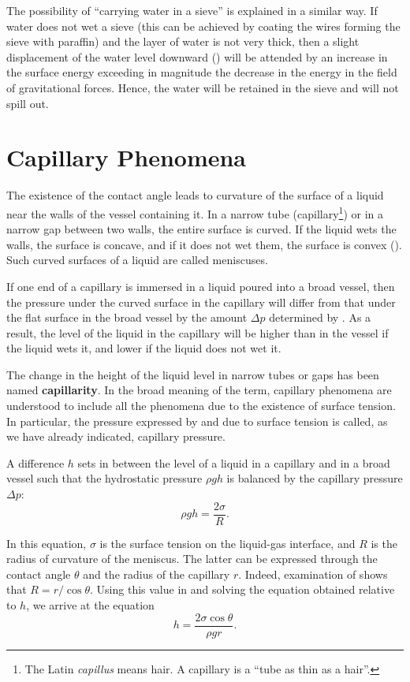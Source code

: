 The possibility of ``carrying water in a sieve'' is explained in a similar way. If water does not wet a sieve (this can be achieved by coating the wires forming the sieve with paraffin) and the layer of water is not very thick, then a slight displacement of the water level downward () will be attended by an increase in the surface energy exceeding in magnitude the decrease in the energy in the field of gravitational forces. Hence, the water will be retained in the sieve and will not spill out.

\section{Capillary Phenomena}\label{sec:14_5}

The existence of the contact angle leads to curvature of the surface of a liquid near the walls of the vessel containing it. In a narrow tube (capillary\footnote{The Latin \textit{capillus} means hair. A capillary is a ``tube as thin as a hair''.}) or in a narrow gap between two walls, the entire surface is curved. If the liquid wets the walls, the surface is concave, and if it does not wet them, the surface is convex (). Such curved surfaces of a liquid are called meniscuses.

If one end of a capillary is immersed in a liquid poured into a broad vessel, then the pressure under the curved surface in the capillary will differ from that under the flat surface in the broad vessel by the amount $\Delta p$ determined by . As a result, the level of the liquid in the capillary will be higher than in the vessel if the liquid wets it, and lower if the liquid does not wet it.

The change in the height of the liquid level in narrow tubes or gaps has been named \textbf{capillarity}. In the broad meaning of the term, capillary phenomena are understood to include all the phenomena due to the existence of surface tension. In particular, the pressure expressed by  and due to surface tension is called, as we have already indicated, capillary pressure. 

A difference $h$ sets in between the level of a liquid in a capillary and in a broad vessel such that the hydrostatic pressure $\rho gh$ is balanced by the capillary pressure $\Delta p$:
\begin{equation}\label{eq:14_8}
	\rho gh = \frac{2\sigma}{R}.
\end{equation}

\noindent
In this equation, $\sigma$ is the surface tension on the liquid-gas interface, and $R$ is the radius of curvature of the meniscus. The latter can be expressed through the contact angle $\theta$ and the radius of the capillary $r$. Indeed, examination of  shows that $R=r/\cos\theta$. Using this value in  and solving the equation obtained relative to $h$, we arrive at the equation
\begin{equation}\label{eq:14_9}
	h = \frac{2\sigma\cos\theta}{\rho gr}.
\end{equation}

